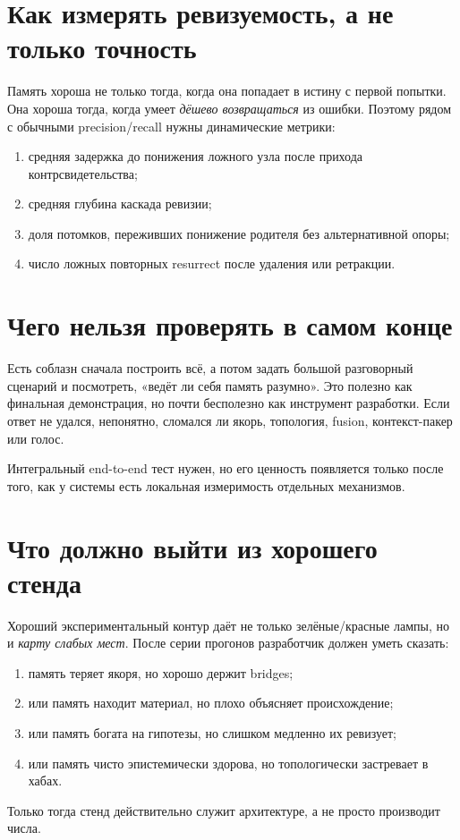 \section{Как измерять ревизуемость, а не только точность}

Память хороша не только тогда, когда она попадает в истину с первой попытки. Она
хороша тогда, когда умеет \emph{дёшево возвращаться} из ошибки. Поэтому рядом с
обычными precision/recall нужны динамические метрики:
\begin{enumerate}
\item средняя задержка до понижения ложного узла после прихода контрсвидетельства;
\item средняя глубина каскада ревизии;
\item доля потомков, переживших понижение родителя без альтернативной опоры;
\item число ложных повторных resurrect после удаления или ретракции.
\end{enumerate}

\section{Чего нельзя проверять в самом конце}

Есть соблазн сначала построить всё, а потом задать большой разговорный сценарий и
посмотреть, «ведёт ли себя память разумно». Это полезно как финальная демонстрация,
но почти бесполезно как инструмент разработки. Если ответ не удался, непонятно,
сломался ли якорь, топология, fusion, контекст-пакер или голос.

\begin{principle}
Интегральный end-to-end тест нужен, но его ценность появляется только после того,
как у системы есть локальная измеримость отдельных механизмов.
\end{principle}

\section{Что должно выйти из хорошего стенда}

Хороший экспериментальный контур даёт не только зелёные/красные лампы, но и
\emph{карту слабых мест}. После серии прогонов разработчик должен уметь сказать:
\begin{enumerate}
\item память теряет якоря, но хорошо держит bridges;
\item или память находит материал, но плохо объясняет происхождение;
\item или память богата на гипотезы, но слишком медленно их ревизует;
\item или память чисто эпистемически здорова, но топологически застревает в хабах.
\end{enumerate}

Только тогда стенд действительно служит архитектуре, а не просто производит числа.
